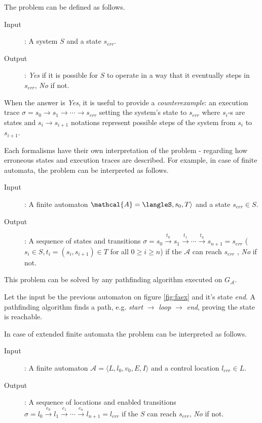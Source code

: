 The problem can be defined as follows.
\begin{description}
	\item[Input]: A system $S$ and a state $s_{err}$.
	\item[Output]: \emph{Yes} if it is possible for $S$ to operate in a way that it eventually steps in $s_{err}$, \emph{No} if not.
\end{description}

When the answer is \emph{Yes}, it is useful to provide a \emph{counterexample}: an execution trace $\sigma = s_0 \to s_1 \to \cdots \to s_{err}$ setting the system's state to $s_{err}$ where $s_i$-s are states  and $s_i \to s_{i+1}$ notations represent possible steps of the system from $s_i$ to $s_{i+1}$.

Each formalisms have their own interpretation of the problem - regarding how erroneous states and execution traces are described. For example, in case of finite automata, the problem can be interpreted as follows. 

\begin{description}
	\item[Input]: A finite automaton $\mathcal{A}=\langleS,s_0,T\rangle$ and a state $s_{err} \in S$.
	\item[Output]: A sequence of states and transitions $\sigma = s_0 \xrightarrow{t_0} s_1 \xrightarrow{t_1} \cdots \xrightarrow{t_n} s_{n+1}=s_{err}$ ($s_i \in S, t_i=(s_i,s_{i+1}) \in T$ for all $0 \geq i \geq n$) if the $\mathcal{A}$ can reach $s_{err}$ , \emph{No} if not.
\end{description}

This problem can be solved by any pathfinding algorithm executed on $G_\mathcal{A}$.

\begin{example}
	Let the input be the previous automaton on figure \ref{fig:faex} and it's state \emph{end}. A pathfinding algorithm finds a path, e.g. \emph{start} $\to$ \emph{loop} $\to$ \emph{end}, proving the state is reachable. 
\end{example}

In case of extended finite automata the problem can be interpreted as follows.
\begin{description}
	\item[Input]: A finite automaton $\mathcal{A}=\langle L,l_0,v_0, E, I\rangle$ and a control location $l_{err} \in L$.
	\item[Output]: A sequence of locations and enabled transitions $\sigma = l_0 \xrightarrow{e_0} l_1 \xrightarrow{e_1} \cdots \xrightarrow{e_n} l_{n+1}=l_{err}$ if the $S$ can reach $s_{err}$, \emph{No} if not.
\end{description}

